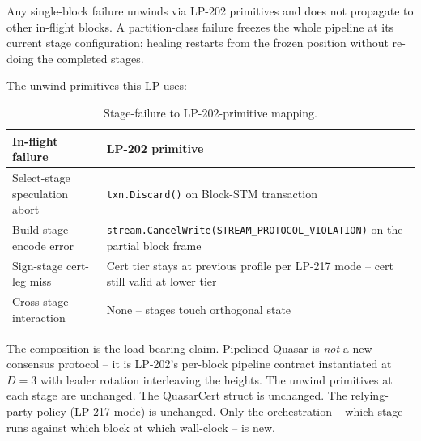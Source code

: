 Any single-block failure unwinds via LP-202 primitives and does not
propagate to other in-flight blocks. A partition-class failure
freezes the whole pipeline at its current stage configuration;
healing restarts from the frozen position without re-doing the
completed stages.

The unwind primitives this LP uses:

\begin{table}[h]
\centering
\small
\begin{tabular}{@{}p{6cm}p{7cm}@{}}
\toprule
\textbf{In-flight failure} & \textbf{LP-202 primitive} \\
\midrule
Select-stage speculation abort & \texttt{txn.Discard()} on Block-STM transaction \\
Build-stage encode error & \texttt{stream.CancelWrite(STREAM\_PROTOCOL\_VIOLATION)} on the partial block frame \\
Sign-stage cert-leg miss & Cert tier stays at previous profile per LP-217 mode -- cert still valid at lower tier \\
Cross-stage interaction & None -- stages touch orthogonal state \\
\bottomrule
\end{tabular}
\caption{Stage-failure to LP-202-primitive mapping.}
\label{tab:unwind}
\end{table}

The composition is the load-bearing claim. Pipelined Quasar is
\emph{not} a new consensus protocol -- it is LP-202's per-block
pipeline contract instantiated at $D{=}3$ with leader rotation
interleaving the heights. The unwind primitives at each stage are
unchanged. The QuasarCert struct is unchanged. The relying-party
policy (LP-217 mode) is unchanged. Only the orchestration -- which
stage runs against which block at which wall-clock -- is new.
